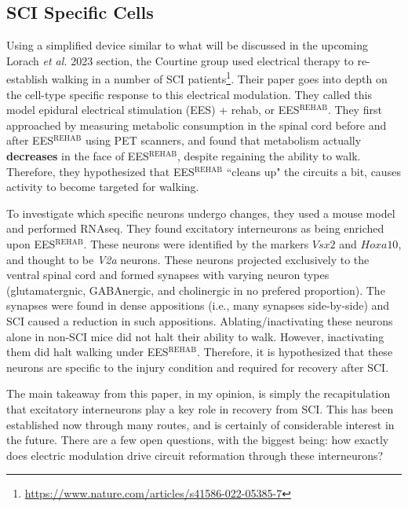 \documentclass[12pt]{report}
\begin{document}
\subsection{SCI Specific Cells}

\label{sec:SCISpecificCells}

Using a simplified device similar to what will be discussed in the upcoming Lorach \textit{et al.} 2023 section, the Courtine group used electrical therapy to re-establish walking in a number of SCI patients\footnote{\url{https://www.nature.com/articles/s41586-022-05385-7}}. Their paper goes into depth on the cell-type specific response to this electrical modulation. They called this model epidural electrical stimulation (EES) + rehab, or EES$^{\mathrm{REHAB}}$. They first approached by measuring metabolic consumption in the spinal cord before and after EES$^{\mathrm{REHAB}}$ using PET scanners, and found that metabolism actually \textbf{decreases} in the face of EES$^{\mathrm{REHAB}}$, despite regaining the ability to walk. Therefore, they hypothesized that EES$^{\mathrm{REHAB}}$ ``cleans up" the circuits a bit, causes activity to become targeted for walking.\newline

To investigate which specific neurons undergo changes, they used a mouse model and performed RNAseq. They found excitatory interneurons as being enriched upon EES$^{\mathrm{REHAB}}$. These neurons were identified by the markers $Vsx2$ and $Hoxa10$, and thought to be \textit{V2a} neurons. These neurons projected exclusively to the ventral spinal cord and formed synapses with varying neuron types (glutamatergnic, GABAnergic, and cholinergic in no prefered proportion). The synapses were found in dense appositions (i.e., many synapses side-by-side) and SCI caused a reduction in such appositions. Ablating/inactivating these neurons alone in non-SCI mice did not halt their ability to walk. However, inactivating them did halt walking under EES$^{\mathrm{REHAB}}$. Therefore, it is hypothesized that these neurons are specific to the injury condition and required for recovery after SCI.\newline

The main takeaway from this paper, in my opinion, is simply the recapitulation that excitatory interneurons play a key role in recovery from SCI. This has been established now through many routes, and is certainly of considerable interest in the future. There are a few open questions, with the biggest being: how exactly does electric modulation drive circuit reformation through these interneurons? 
\end{document}
